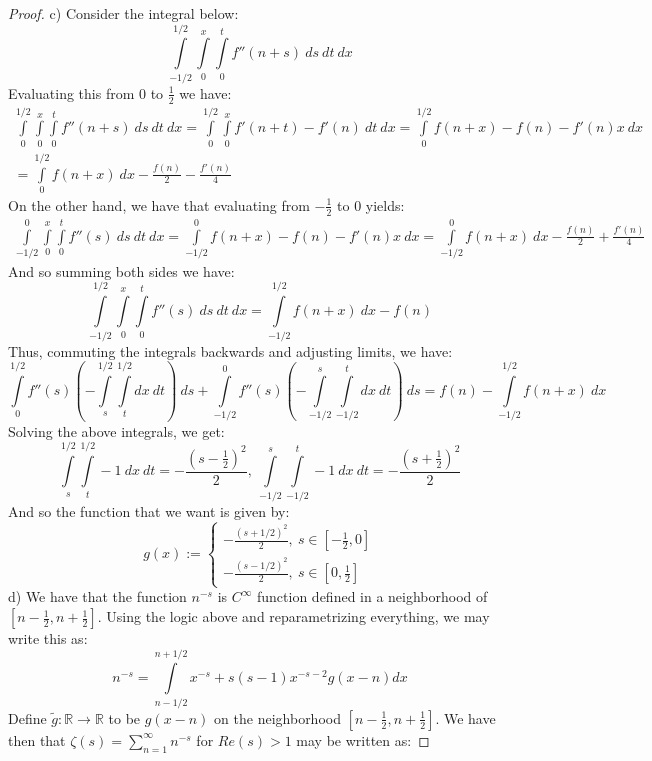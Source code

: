 \documentclass{article}
\newcommand{\bb}[1]{\mathbb{#1}}
\begin{document}
\begin{proof}
    c) Consider the integral below:
    \[
      \int\limits_{-1/2}^{1/2}\int\limits_{0}^{x}\int\limits_{0}^{t}f''(n+s) \ ds \ dt \ dx
    \]
    Evaluating this from $0$ to $\frac{1}{2}$ we have:
    \begin{align*}
      \int\limits_{0}^{1/2}\int\limits_{0}^{x}\int\limits_{0}^{t}f''(n+s) \ ds \ dt \ dx = \int\limits_{0}^{1/2}\int\limits_{0}^{x}f'(n+t) - f'(n) \ dt \ dx = \int\limits_{0}^{1/2} f(n+x) - f(n) - f'(n)x \ dx \\
   = \int\limits_{0}^{1/2}f(n+x) \ dx - \frac{f(n)}{2} - \frac{f'(n)}{4} 
    \end{align*}
    On the other hand, we have that evaluating from $-\frac{1}{2}$ to $0$ yields:
    \begin{align*}
      \int\limits_{-1/2}^{0}\int\limits_{0}^{x}\int\limits_{0}^{t}f''(s) \ ds \ dt \ dx = \int\limits_{-1/2}^{0} f(n+x) - f(n) - f'(n)x \ dx = \int\limits_{-1/2}^{0}f(n+x) \ dx - \frac{f(n)}{2} + \frac{f'(n)}{4}
    \end{align*}
    And so summing both sides we have:
    \[
      \int\limits_{-1/2}^{1/2}\int\limits_{0}^{x}\int\limits_{0}^{t}f''(s) \ ds \ dt \ dx = \int\limits_{-1/2}^{1/2}f(n+x)\ dx - f(n)
    \]
    Thus, commuting the integrals backwards and adjusting limits, we have:
    \[
      \int\limits_{0}^{1/2}f''(s) \left(-\int\limits_{s}^{1/2}\int\limits_{t}^{1/2}dx\ dt \right)  \ ds + \int\limits_{-1/2}^{0}f''(s) \left(-\int\limits_{-1/2}^{s}\int\limits_{-1/2}^{t}dx\ dt \right) \ ds = f(n) - \int\limits_{-1/2}^{1/2}f(n+x) \ dx
    \]
    Solving the above integrals, we get:
    \[
      \int\limits_{s}^{1/2}\int\limits_{t}^{1/2}-1 \ dx \ dt = -\frac{(s-\frac{1}{2})^{2}}{2},  \ \int\limits_{-1/2}^{s}\int\limits_{-1/2}^{t}-1 \ dx \ dt = - \frac{(s+ \frac{1}{2})^{2}}{2} 
    \]
    And so the function that we want is given by:
    \[
      g(x) :=
      \begin{cases}
        - \frac{(s+ 1/2)^{2}}{2}, \ s \in [-\frac{1}{2}, 0]\\
      - \frac{(s- 1/2)^{2}}{2}, \ s \in [0, \frac{1}{2}]
      \end{cases}
    \]
    d) We have that the function $n^{-s}$ is $C^{\infty}$ function defined in a neighborhood of $[n-\frac{1}{2}, n+ \frac{1}{2}]$. Using the logic above and reparametrizing everything, we may write this as:
    \[
      n^{-s} = \int\limits_{n-1/2}^{n + 1/2}x^{-s} + s(s-1)x^{-s-2}g(x-n)dx
    \]
    Define $\widetilde g : \bb{R} \to \bb{R}$ to be $g(x-n)$ on the neighborhood $[n-\frac{1}{2}, n+\frac{1}{2}]$. We have then that $\zeta(s) = \sum_{n=1}^{\infty}n^{-s}$ for $Re(s) > 1$ may be written as:

\end{proof}
\end{document}
